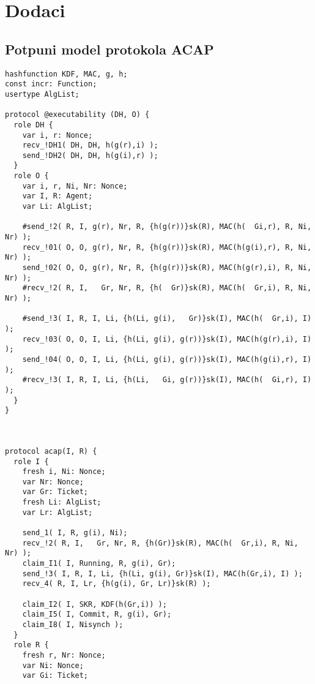 \chapter{Dodaci}


\begin{subappendices}
\renewcommand{\thesection}{\Alph{section}}

\section{Potpuni model protokola ACAP} \label{app:model}

\begin{small}
\begin{verbatim}
hashfunction KDF, MAC, g, h;
const incr: Function;
usertype AlgList;

protocol @executability (DH, O) {
  role DH {
    var i, r: Nonce;
    recv_!DH1( DH, DH, h(g(r),i) );
    send_!DH2( DH, DH, h(g(i),r) );
  }
  role O {
    var i, r, Ni, Nr: Nonce;
    var I, R: Agent;
    var Li: AlgList;

    #send_!2( R, I, g(r), Nr, R, {h(g(r))}sk(R), MAC(h(  Gi,r), R, Ni, Nr) );
    recv_!01( O, O, g(r), Nr, R, {h(g(r))}sk(R), MAC(h(g(i),r), R, Ni, Nr) );
    send_!02( O, O, g(r), Nr, R, {h(g(r))}sk(R), MAC(h(g(r),i), R, Ni, Nr) );
    #recv_!2( R, I,   Gr, Nr, R, {h(  Gr)}sk(R), MAC(h(  Gr,i), R, Ni, Nr) );

    #send_!3( I, R, I, Li, {h(Li, g(i),   Gr)}sk(I), MAC(h(  Gr,i), I) );
    recv_!03( O, O, I, Li, {h(Li, g(i), g(r))}sk(I), MAC(h(g(r),i), I) );
    send_!04( O, O, I, Li, {h(Li, g(i), g(r))}sk(I), MAC(h(g(i),r), I) );
    #recv_!3( I, R, I, Li, {h(Li,   Gi, g(r))}sk(I), MAC(h(  Gi,r), I) );
  }
}



protocol acap(I, R) {
  role I {
    fresh i, Ni: Nonce;
    var Nr: Nonce;
    var Gr: Ticket;
    fresh Li: AlgList;
    var Lr: AlgList;
    
    send_1( I, R, g(i), Ni);
    recv_!2( R, I,   Gr, Nr, R, {h(Gr)}sk(R), MAC(h(  Gr,i), R, Ni, Nr) );
    claim_I1( I, Running, R, g(i), Gr);
    send_!3( I, R, I, Li, {h(Li, g(i), Gr)}sk(I), MAC(h(Gr,i), I) );
    recv_4( R, I, Lr, {h(g(i), Gr, Lr)}sk(R) );
    
    claim_I2( I, SKR, KDF(h(Gr,i)) );
    claim_I5( I, Commit, R, g(i), Gr);
    claim_I8( I, Nisynch );
  }
  role R {
    fresh r, Nr: Nonce;
    var Ni: Nonce;
    var Gi: Ticket;
    

\end{verbatim}
\end{small}
\end{subappendices}
